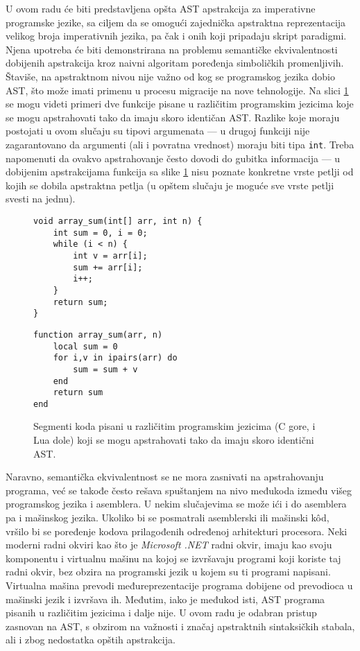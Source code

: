 U ovom radu će biti predstavljena opšta AST apstrakcija za imperativne programske jezike, sa ciljem da se omogući zajednička apstraktna reprezentacija velikog broja imperativnih jezika, pa čak i onih koji pripadaju skript paradigmi. Njena upotreba će biti demonstrirana na problemu semantičke ekvivalentnosti dobijenih apstrakcija kroz naivni algoritam poređenja simboličkih promenljivih. Štaviše, na apstraktnom nivou nije važno od kog se programskog jezika dobio AST, što može imati primenu u procesu migracije na nove tehnologije. Na slici \ref{fig:IntroExample} se mogu videti primeri dve funkcije pisane u različitim programskim jezicima koje se mogu apstrahovati tako da imaju skoro identičan AST. Razlike koje moraju postojati u ovom slučaju su tipovi argumenata --- u drugoj funkciji nije zagarantovano da argumenti (ali i povratna vrednost) moraju biti tipa \texttt{int}. Treba napomenuti da ovakvo apstrahovanje često dovodi do gubitka informacija --- u dobijenim apstrakcijama funkcija sa slike \ref{fig:IntroExample} nisu poznate konkretne vrste petlji od kojih se dobila apstraktna petlja (u opštem slučaju je moguće sve vrste petlji svesti na jednu).

\begin{figure}[h!]
\begin{lstlisting}
void array_sum(int[] arr, int n) {
    int sum = 0, i = 0;
    while (i < n) {
        int v = arr[i];    
        sum += arr[i];
        i++;
    }
    return sum;
}
\end{lstlisting}
\begin{lstlisting}
function array_sum(arr, n)
    local sum = 0
    for i,v in ipairs(arr) do
        sum = sum + v
    end
    return sum
end
\end{lstlisting}
\caption{Segmenti koda pisani u različitim programskim jezicima (C gore, i Lua dole) koji se mogu apstrahovati tako da imaju skoro identični AST.}
\label{fig:IntroExample}
\end{figure}

Naravno, semantička ekvivalentnost se ne mora zasnivati na apstrahovanju programa, već se takođe često rešava spuštanjem na nivo međukoda između višeg programskog jezika i asemblera. U nekim slučajevima se može ići i do asemblera pa i mašinskog jezika. Ukoliko bi se posmatrali asemblerski ili mašinski k\^od, vršilo bi se poređenje kodova prilagođenih određenoj arhitekturi procesora. Neki moderni radni okviri kao što je \emph{Microsoft .NET} radni okvir, imaju kao svoju komponentu i virtualnu mašinu na kojoj se izvršavaju programi koji koriste taj radni okvir, bez obzira na programski jezik u kojem su ti programi napisani. Virtualna mašina prevodi međureprezentacije  programa dobijene od prevodioca u mašinski jezik i izvršava ih. Međutim, iako je međukod isti, AST programa pisanih u različitim jezicima i dalje nije. U ovom radu je odabran pristup zasnovan na AST, s obzirom na važnosti i značaj apstraktnih sintaksičkih stabala, ali i zbog nedostatka opštih apstrakcija.

